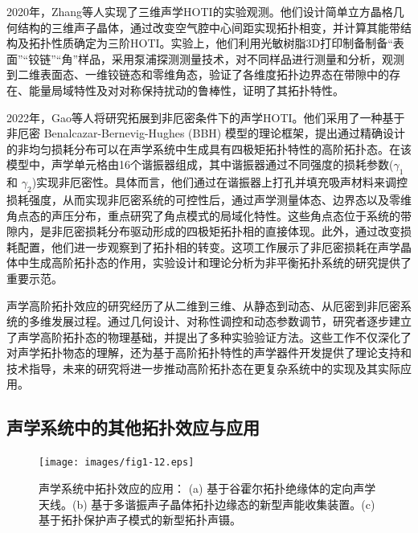 2020年，Zhang等人实现了三维声学HOTI的实验观测\cite{i7}。他们设计简单立方晶格几何结构的三维声子晶体，通过改变空气腔中心间距实现拓扑相变，并计算其能带结构及拓扑性质确定为三阶HOTI。实验上，他们利用光敏树脂3D打印制备制备“表面”“铰链”“角”样品，采用泵浦探测测量技术，对不同样品进行测量和分析，观测到二维表面态、一维铰链态和零维角态，验证了各维度拓扑边界态在带隙中的存在、能量局域特性及对对称保持扰动的鲁棒性，证明了其拓扑特性。

2022年，Gao等人将研究拓展到非厄密条件下的声学HOTI\cite{i8}。他们采用了一种基于非厄密 Benalcazar-Bernevig-Hughes (BBH) 模型的理论框架，提出通过精确设计的非均匀损耗分布可以在声学系统中生成具有四极矩拓扑特性的高阶拓扑态。在该模型中，声学单元格由16个谐振器组成，其中谐振器通过不同强度的损耗参数(\(\gamma_1\) 和 \(\gamma_2\))实现非厄密性。具体而言，他们通过在谐振器上打孔并填充吸声材料来调控损耗强度，从而实现非厄密系统的可控性后，通过声学测量体态、边界态以及零维角点态的声压分布，重点研究了角点模式的局域化特性。这些角点态位于系统的带隙内，是非厄密损耗分布驱动形成的四极矩拓扑相的直接体现。此外，通过改变损耗配置，他们进一步观察到了拓扑相的转变。这项工作展示了非厄密损耗在声学晶体中生成高阶拓扑态的作用，实验设计和理论分析为非平衡拓扑系统的研究提供了重要示范。

声学高阶拓扑效应的研究经历了从二维到三维、从静态到动态、从厄密到非厄密系统的多维发展过程。通过几何设计、对称性调控和动态参数调节，研究者逐步建立了声学高阶拓扑态的物理基础，并提出了多种实验验证方法。这些工作不仅深化了对声学拓扑物态的理解，还为基于高阶拓扑特性的声学器件开发提供了理论支持和技术指导，未来的研究将进一步推动高阶拓扑态在更复杂系统中的实现及其实际应用。

\subsection{声学系统中的其他拓扑效应与应用}

\begin{figure}[h!]
    \centering
    \texttt{[image: images/fig1-12.eps]} 
    \caption{声学系统中拓扑效应的应用：
    (a) 基于谷霍尔拓扑绝缘体的定向声学天线\cite{j2}。(b) 基于多谐振声子晶体拓扑边缘态的新型声能收集装置\cite{j17}。(c) 基于拓扑保护声子模式的新型拓扑声镊\cite{j13}。
    }
    \label{fig_1_12}
\end{figure}

